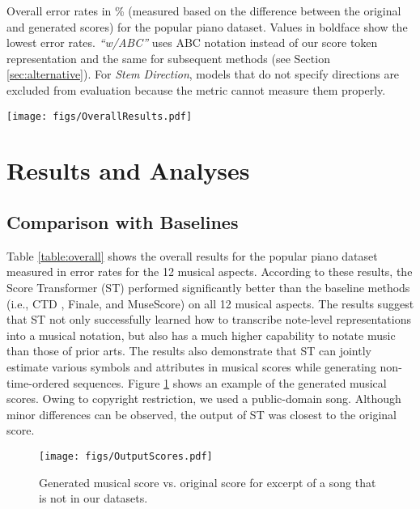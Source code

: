 \documentclass[sigconf]{acmart} %
\begin{document}
\begin{table*}[ht]
 \caption{Overall error rates in \% (measured based on the difference between the original and generated scores) for the popular piano dataset. Values in boldface show the lowest error rates. \textit{“w/ABC”} uses ABC notation instead of our score token representation and the same for subsequent methods (see Section \ref{sec:alternative}). For \textit{Stem Direction}, models that do not specify directions are excluded from evaluation because the metric cannot measure them properly.}
 \label{table:overall}
 \texttt{[image: figs/OverallResults.pdf]}
\end{table*}

\section{Results and Analyses}
\label{sec:6}

\subsection{Comparison with Baselines}
Table \ref{table:overall} shows the overall results for the popular piano dataset measured in error rates for the 12 musical aspects. According to these results, the Score Transformer (ST) performed significantly better than the baseline methods (i.e., CTD \cite{Cogliati2016}, Finale, and MuseScore) on all 12 musical aspects. The results suggest that ST not only successfully learned how to transcribe note-level representations into a musical notation, but also has a much higher capability to notate music than those of prior arts. The results also demonstrate that ST can jointly estimate various symbols and attributes in musical scores while generating non-time-ordered sequences. Figure \ref{fig:output} shows an example of the generated musical scores. Owing to copyright restriction, we used a public-domain song. Although minor differences can be observed, the output of ST was closest to the original score.

\begin{figure}[h]
 \centerline{
 \texttt{[image: figs/OutputScores.pdf]}}
 \caption{Generated musical score vs. original score for excerpt of a song that is not in our datasets.}
 \label{fig:output}
\end{figure}
\end{document}
